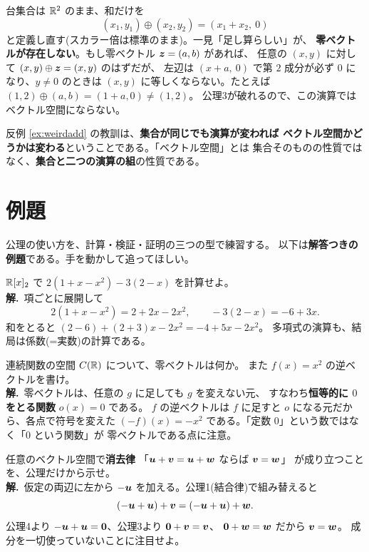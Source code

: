 \begin{hanrei}[和の定義を変えると公理が壊れる]\label{ex:weirdadd}
台集合は $\mathbb{R}^2$ のまま、和だけを
\[
(x_1, y_1) \oplus (x_2, y_2) = (x_1 + x_2,\ 0)
\]
と定義し直す(スカラー倍は標準のまま)。一見「足し算らしい」が、
\textbf{零ベクトルが存在しない}。もし零ベクトル $\bm{z} = (a, b)$ があれば、
任意の $(x, y)$ に対して $(x, y) \oplus \bm{z} = (x, y)$ のはずだが、
左辺は $(x + a,\ 0)$ で第 $2$ 成分が必ず $0$ になり、$y \ne 0$ のときは
$(x, y)$ に等しくならない。たとえば $(1, 2) \oplus (a, b) = (1 + a, 0) \ne (1, 2)$。
公理3が破れるので、この演算ではベクトル空間にならない。
\end{hanrei}

\begin{chui}
反例 \ref{ex:weirdadd} の教訓は、\textbf{集合が同じでも演算が変われば
ベクトル空間かどうかは変わる}ということである。「ベクトル空間」とは
集合そのものの性質ではなく、\textbf{集合と二つの演算の組}の性質である。
\end{chui}

\section{例題}

公理の使い方を、計算・検証・証明の三つの型で練習する。
以下は\textbf{解答つきの例題}である。手を動かして追ってほしい。

\begin{rei}[例題・基本(計算)]
$\mathbb{R}[x]_2$ で $2(1 + x - x^2) - 3(2 - x)$ を計算せよ。\\
\textbf{解.}\ 項ごとに展開して
\[
2(1 + x - x^2) = 2 + 2x - 2x^2, \qquad -3(2 - x) = -6 + 3x.
\]
和をとると $(2 - 6) + (2 + 3)x - 2x^2 = -4 + 5x - 2x^2$。
多項式の演算も、結局は係数(=実数)の計算である。
\end{rei}

\begin{rei}[例題・基本(検証)]
連続関数の空間 $C(\mathbb{R})$ について、零ベクトルは何か。
また $f(x) = x^2$ の逆ベクトルを書け。\\
\textbf{解.}\ 零ベクトルは、任意の $g$ に足しても $g$ を変えない元、
すなわち\textbf{恒等的に $0$ をとる関数} $o(x) = 0$ である。
$f$ の逆ベクトルは $f$ に足すと $o$ になる元だから、各点で符号を変えた
$(-f)(x) = -x^2$ である。「定数 $0$」という数ではなく「$0$ という関数」が
零ベクトルである点に注意。
\end{rei}

\begin{rei}[例題・基本(証明)]\label{rei:cancel}
任意のベクトル空間で\textbf{消去律}
「$\bm{u} + \bm{v} = \bm{u} + \bm{w}$ ならば $\bm{v} = \bm{w}$」
が成り立つことを、公理だけから示せ。\\
\textbf{解.}\ 仮定の両辺に左から $-\bm{u}$ を加える。公理1(結合律)で組み替えると
\[
(-\bm{u} + \bm{u}) + \bm{v} = (-\bm{u} + \bm{u}) + \bm{w}.
\]
公理4より $-\bm{u} + \bm{u} = \bm{0}$、公理3より $\bm{0} + \bm{v} = \bm{v}$、
$\bm{0} + \bm{w} = \bm{w}$ だから $\bm{v} = \bm{w}$。
成分を一切使っていないことに注目せよ。
\end{rei}

